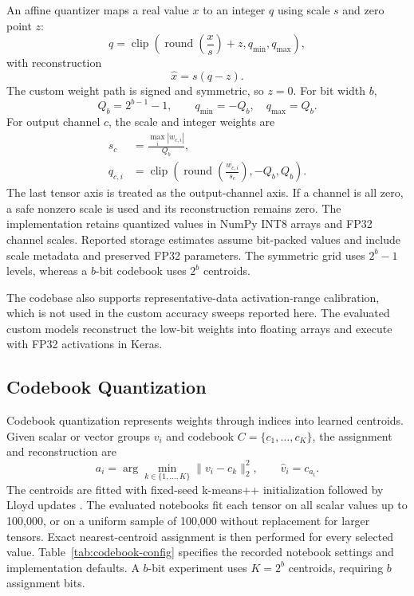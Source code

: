 \documentclass[conference]{IEEEtran}
\begin{document}
An affine quantizer maps a real value $x$ to an integer $q$ using scale $s$ and zero point $z$:
\begin{equation}
q=\operatorname{clip}\!\left(\operatorname{round}\!\left(\frac{x}{s}\right)+z,q_{\min},q_{\max}\right),
\label{eq:affine-quant}
\end{equation}
with reconstruction
\begin{equation}
\hat{x}=s(q-z).
\label{eq:affine-dequant}
\end{equation}
The custom weight path is signed and symmetric, so $z=0$. For bit width $b$,
\begin{equation}
Q_b=2^{b-1}-1, \qquad q_{\min}=-Q_b, \quad q_{\max}=Q_b.
\end{equation}
For output channel $c$, the scale and integer weights are
\begin{equation}
\begin{aligned}
s_c &= \frac{\max_i |w_{c,i}|}{Q_b}, \\
q_{c,i} &= \operatorname{clip}\!\left(\operatorname{round}\!\left(\frac{w_{c,i}}{s_c}\right),-Q_b,Q_b\right).
\end{aligned}
\label{eq:custom-ptq}
\end{equation}
The last tensor axis is treated as the output-channel axis. If a channel is all zero, a safe nonzero scale is used and its reconstruction remains zero. The implementation retains quantized values in NumPy INT8 arrays and FP32 channel scales. Reported storage estimates assume bit-packed values and include scale metadata and preserved FP32 parameters. The symmetric grid uses $2^b-1$ levels, whereas a $b$-bit codebook uses $2^b$ centroids.

The codebase also supports representative-data activation-range calibration, which is not used in the custom accuracy sweeps reported here. The evaluated custom models reconstruct the low-bit weights into floating arrays and execute with FP32 activations in Keras.

\subsection{Codebook Quantization}

Codebook quantization represents weights through indices into learned centroids. Given scalar or vector groups $v_i$ and codebook $C=\{c_1,\ldots,c_K\}$, the assignment and reconstruction are
\begin{equation}
a_i=\arg\min_{k\in\{1,\ldots,K\}}\|v_i-c_k\|_2^2,
\qquad \hat{v}_i=c_{a_i}.
\label{eq:codebook}
\end{equation}
The centroids are fitted with fixed-seed k-means++ initialization \cite{arthur2007} followed by Lloyd updates \cite{lloyd1982}. The evaluated notebooks fit each tensor on all scalar values up to 100,000, or on a uniform sample of 100,000 without replacement for larger tensors. Exact nearest-centroid assignment is then performed for every selected value. Table~\ref{tab:codebook-config} specifies the recorded notebook settings and implementation defaults. A $b$-bit experiment uses $K=2^b$ centroids, requiring $b$ assignment bits.
\end{document}

